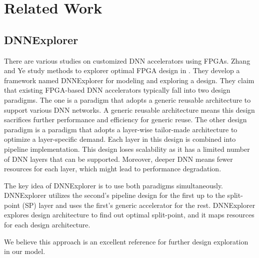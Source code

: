 
\chapter{Related Work}
\section{DNNExplorer}
There are various studies on customized DNN accelerators using FPGAs.
Zhang and Ye study methods to explorer optimal FPGA design in \cite{zhang2020dnnexplorer}. They develop a framework named DNNExplorer for modeling and exploring a design. They claim that existing FPGA-based DNN accelerators typically fall into two design paradigms. The one is a paradigm that adopts a generic reusable architecture to support various DNN networks. A generic reusable architecture means this design sacrifices further performance and efficiency for generic reuse. The other design paradigm is a paradigm that adopts a layer-wise tailor-made architecture to optimize a layer-specific demand. Each layer in this design is combined into pipeline implementation. This design loses scalability as it has a limited number of DNN layers that can be supported. Moreover, deeper DNN means fewer resources for each layer, which might lead to performance degradation.

The key idea of DNNExplorer is to use both paradigms simultaneously. DNNExplorer utilizes the second's pipeline design for the first up to the split-point (SP) layer and uses the first's generic accelerator for the rest. DNNExplorer explores design architecture to find out optimal split-point, and it maps resources for each design architecture.

We believe this approach is an excellent reference for further design exploration in our model.

